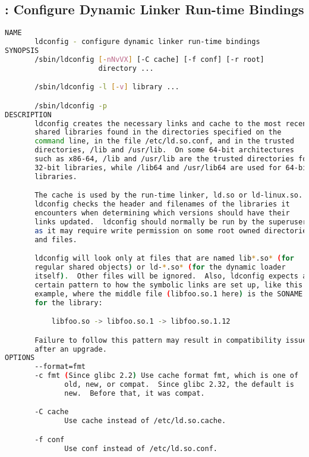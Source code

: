% 
\subsection{: Configure Dynamic Linker Run-time Bindings}

{\tiny{
\begin{lstlisting}[language=bash]
NAME
       ldconfig - configure dynamic linker run-time bindings
SYNOPSIS
       /sbin/ldconfig [-nNvVX] [-C cache] [-f conf] [-r root]
                      directory ...

       /sbin/ldconfig -l [-v] library ...

       /sbin/ldconfig -p
DESCRIPTION
       ldconfig creates the necessary links and cache to the most recent
       shared libraries found in the directories specified on the
       command line, in the file /etc/ld.so.conf, and in the trusted
       directories, /lib and /usr/lib.  On some 64-bit architectures
       such as x86-64, /lib and /usr/lib are the trusted directories for
       32-bit libraries, while /lib64 and /usr/lib64 are used for 64-bit
       libraries.

       The cache is used by the run-time linker, ld.so or ld-linux.so.
       ldconfig checks the header and filenames of the libraries it
       encounters when determining which versions should have their
       links updated.  ldconfig should normally be run by the superuser
       as it may require write permission on some root owned directories
       and files.

       ldconfig will look only at files that are named lib*.so* (for
       regular shared objects) or ld-*.so* (for the dynamic loader
       itself).  Other files will be ignored.  Also, ldconfig expects a
       certain pattern to how the symbolic links are set up, like this
       example, where the middle file (libfoo.so.1 here) is the SONAME
       for the library:

           libfoo.so -> libfoo.so.1 -> libfoo.so.1.12

       Failure to follow this pattern may result in compatibility issues
       after an upgrade.
OPTIONS
       --format=fmt
       -c fmt (Since glibc 2.2) Use cache format fmt, which is one of
              old, new, or compat.  Since glibc 2.32, the default is
              new.  Before that, it was compat.

       -C cache
              Use cache instead of /etc/ld.so.cache.

       -f conf
              Use conf instead of /etc/ld.so.conf.


\end{lstlisting}}}
